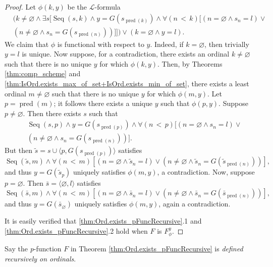 \begin{proof}
    Let $\phi(k,y)$ be the $\mathcal{L}$-formula
    \begin{equation*}
        \begin{split}
    & (k \neq \varnothing \land \exists s [\operatorname{Seq}(s,k) \land 
    y = G(s_{\operatorname{pred}(k)}) \land \forall (n\,<\,k)[(n=\varnothing \land s_n = l)
    \lor\\ &(n \neq \varnothing \land s_n = G(s_{\operatorname{pred}(n)}))]])
    \lor (k = \varnothing \land y = l).
        \end{split}
    \end{equation*}
    We claim that $\phi$ is functional with respect to $y$.
    Indeed, if $k=\varnothing$, then trivially $y=l$ is unique.
    Now suppose, for a contradiction, there exists an ordinal $k\neq \varnothing$ such that there
    is no unique $y$ for which $\phi(k,y)$. 
    Then, by Theorems \ref{thm:comp_scheme} and 
    \ref{thm:IsOrd.exists_max_of_set+IsOrd.exists_min_of_set}, there exists a
    least ordinal $m\neq\varnothing$ such that there is no unique $y$ for which $\phi(m,y)$.
    Let $p=\operatorname{pred}(m)$; it follows there exists a unique $y$ such that $\phi(p,y)$.
    Suppose $p\neq \varnothing$. Then there exists $s$ such that
    \begin{equation*}
        \begin{split}
    &\operatorname{Seq}(s,p) \land y = G(s_{\operatorname{pred}(p)}) \land 
    \forall (n\,<\,p)[(n=\varnothing \land s_n = l) \lor \\& 
    (n \neq \varnothing \land s_n = G(s_{\operatorname{pred}(n)}))].
        \end{split}
    \end{equation*}
    But then $\tilde{s} = s \cup \langle p, G(s_{\operatorname{pred}(p)}) \rangle$ satisfies
    \begin{equation*}
    \operatorname{Seq}(\tilde{s},m) \land \forall (n\,<\,m)[(n=\varnothing \land \tilde{s}_n = l) 
    \lor (n \neq \varnothing \land \tilde{s}_n = G(\tilde{s}_{\operatorname{pred}(n)}))], 
    \end{equation*}
    and thus $y = G(\tilde{s}_p)$ uniquely satisfies $\phi(m,y)$, a contradiction.
    Now, suppose $p=\varnothing$. Then $\bar{s}=\langle \varnothing, l \rangle$ satisfies
    \begin{equation*}
        \operatorname{Seq}(\bar{s},m) \land \forall (n\,<\,m)[(n=\varnothing \land \bar{s}_n = l) 
        \lor (n \neq \varnothing \land \bar{s}_n = G(\bar{s}_{\operatorname{pred}(n)}))], 
    \end{equation*}
    and thus $y = G(\bar{s}_\varnothing)$ uniquely satisfies $\phi(m,y)$, again a contradiction.
    
    It is easily verified that \ref{thm:Ord.exists_pFuncRecursive}.1 and 
    \ref{thm:Ord.exists_pFuncRecursive}.2 hold when $F$ is $F_\phi^y$.
\end{proof}

\begin{definition}
    \label{def:Ord.pFuncRecursive}
    Say the \textit{p}-function $F$ in Theorem \ref{thm:Ord.exists_pFuncRecursive} is
    \textit{defined recursively on ordinals}.
\end{definition}
